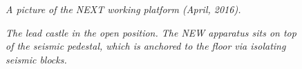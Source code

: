\begin{figure}[hpt!]
    \bigskip
    \begin{center}\leavevmode
        \caption{\textit{A picture of the NEXT working platform (April, 2016).}}
        \label{fig.WPP}
    \end{center}
\end{figure}

%
%
%


\begin{figure}[hpt!]
    \bigskip
    \begin{center}\leavevmode
        \caption{\textit{The lead castle in the open position. The NEW apparatus sits on top of the seismic pedestal, which is anchored to the floor via isolating seismic blocks.}}
        \label{fig.LCWN}
    \end{center}
\end{figure}

